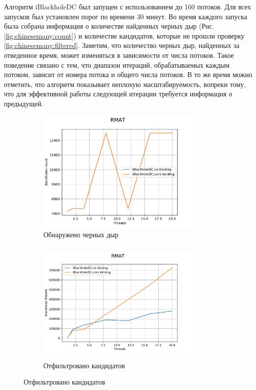 \documentclass[12pt,a4paper,oneside,openany]{article}
\theoremstyle{definition}
\theoremstyle{lemma}
\theoremstyle{remark}
\begin{document}
Алгоритм iBlackholeDC был запущен с использованием до 160 потоков.
Для всех запусков был установлен порог по времени 30 минут. Во время каждого запуска была собрана информация
о количестве найденных черных дыр (Рис. \ref{fig:chinesemany:count})
и количестве кандидатов, которые не прошли проверку \ref{fig:chinesemany:filtered}.
Заметим, что количество черных дыр, найденных за отведенное время, может
изменяться в зависимости от числа потоков. Такое поведение связано с
тем, что диапазон итераций, обрабатываемых каждым потоком, зависит
от номера потока и общего числа потоков.
В то же время можно отметить, что алгоритм показывает неплохую масштабируемость,
вопреки тому, что для эффективной работы следующей итерации требуется информация
о предыдущей.

\begin{figure}[H]
    \begin{subfigure}{.5\textwidth}
      \centering
      \includegraphics[width=8cm]{images/6_count.pdf}
      \caption{Обнаружено черных дыр}
      \label{fig:chinesebinding:count}
    \end{subfigure}
    \begin{subfigure}{.5\textwidth}
      \centering
      \includegraphics[width=8cm,height=6cm]{images/6_filtered.pdf}
      \caption{Отфильтровано кандидатов}
      \label{fig:chinesebinding:filtered}
    \end{subfigure}

\end{figure}
\end{document}
